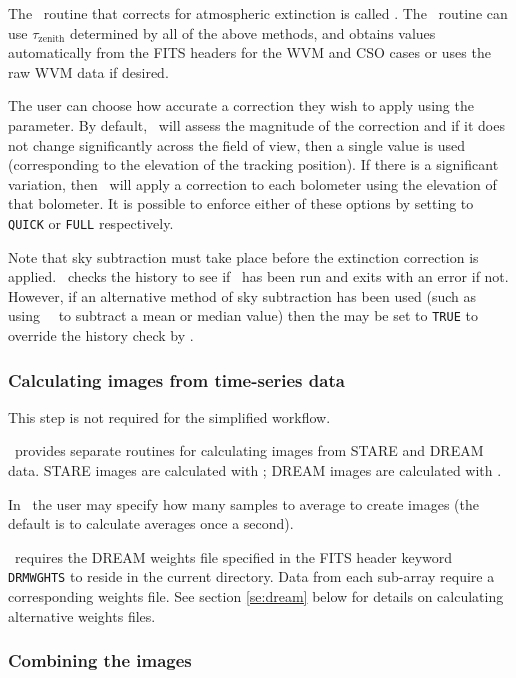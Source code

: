 \documentclass[oneside,11pt]{starlink}
\begin{document}
The \SMURF\ routine that corrects for atmospheric extinction is called
\extinction. The \extinction\ routine can use $\tau_{\textrm{zenith}}$
determined by all of the above methods, and obtains values
automatically from the FITS headers for the WVM and CSO cases or uses
the raw WVM data if desired.

The user can choose how accurate a correction they wish to apply using
the  parameter. By default, \extinction\ will assess
the magnitude of the correction and if it does not change
significantly across the field of view, then a single value is used
(corresponding to the elevation of the tracking position). If there is
a significant variation, then \extinction\ will apply a correction to
each bolometer using the elevation of that bolometer. It is possible
to enforce either of these options by setting  to
\texttt{QUICK} or \texttt{FULL} respectively.

Note that sky subtraction must take place before the extinction
correction is applied. \extinction\ checks the history to see if
\remsky\ has been run and exits with an error if not. However, if an
alternative method of sky subtraction has been used (such as using
\KAPPA\ \csub\ to subtract a mean or median value) then the
 may be set to \texttt{TRUE} to override the history
check by \extinction.

\subsubsection{Calculating images from time-series
  data\label{se:dsimages}}

This step is not required for the simplified workflow.

\SMURF\ provides separate routines for calculating images from STARE
and DREAM data. STARE images are calculated with \starecalc; DREAM
images are calculated with \dreamsolve.

In \starecalc\ the user may specify how many samples to average to
create images (the default is to calculate averages once a second).

\dreamsolve\ requires the DREAM weights file specified in the FITS
header keyword \texttt{DRMWGHTS} to reside in the current
directory. Data from each sub-array require a corresponding weights
file. See section \ref{se:dream} below for details on calculating
alternative weights files.

\subsubsection{Combining the images\label{se:mosaic}}
\end{document}
